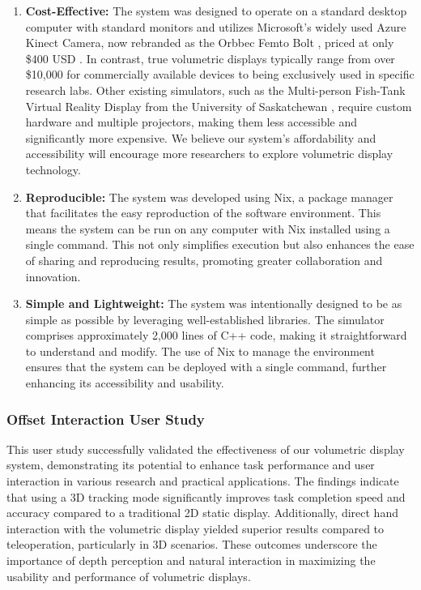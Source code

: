 \begin{enumerate}
    \item \textbf{Cost-Effective:} The system was designed to operate on a standard desktop computer with standard monitors and utilizes Microsoft's widely used Azure Kinect Camera, now rebranded as the Orbbec Femto Bolt \cite{noauthor_microsofts_nodate}, priced at only \$400 USD \cite{noauthor_femto_nodate}. In contrast, true volumetric displays typically range from over \$10,000 \cite{noauthor_products_nodate} for commercially available devices to being exclusively used in specific research labs. Other existing simulators, such as the Multi-person Fish-Tank Virtual Reality Display from the University of Saskatchewan \cite{10.1145/3281505.3281540}, require custom hardware and multiple projectors, making them less accessible and significantly more expensive. We believe our system's affordability and accessibility will encourage more researchers to explore volumetric display technology.

    \item \textbf{Reproducible:} The system was developed using Nix, a package manager that facilitates the easy reproduction of the software environment. This means the system can be run on any computer with Nix installed using a single command. This not only simplifies execution but also enhances the ease of sharing and reproducing results, promoting greater collaboration and innovation.

    \item \textbf{Simple and Lightweight:} The system was intentionally designed to be as simple as possible by leveraging well-established libraries. The simulator comprises approximately 2,000 lines of C++ code, making it straightforward to understand and modify. The use of Nix to manage the environment ensures that the system can be deployed with a single command, further enhancing its accessibility and usability.
\end{enumerate}

\subsubsection{Offset Interaction User Study}

This user study successfully validated the effectiveness of our volumetric display system, demonstrating its potential to enhance task performance and user interaction in various research and practical applications. The findings indicate that using a 3D tracking mode significantly improves task completion speed and accuracy compared to a traditional 2D static display. Additionally, direct hand interaction with the volumetric display yielded superior results compared to teleoperation, particularly in 3D scenarios. These outcomes underscore the importance of depth perception and natural interaction in maximizing the usability and performance of volumetric displays. \\

